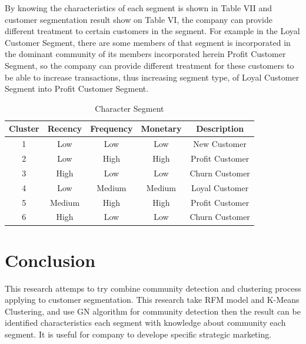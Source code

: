 \documentclass[conference]{IEEEtran}
\begin{document}
By knowing the characteristics of each segment is shown in Table VII and customer segmentation result show on Table VI, the company can provide different treatment to certain customers in the segment. For example in the Loyal Customer Segment, there are some members of that segment is incorporated in the dominant community of its members incorporated herein Profit Customer Segment, so the company can provide different treatment for these customers to be able to increase transactions, thus increasing segment type, of Loyal Customer Segment into Profit Customer Segment.

\begin{table}[h]
\renewcommand{\arraystretch}{1.3}
\caption{Character Segment}
\label{tab:Character_segment}
\centering
\begin{tabular}{c|c|c|c|c}
    \hline
    Cluster & Recency & Frequency & Monetary & Description\\
    \hline
    1 & Low & Low & Low & New Customer\\
    \hline
    2 & Low & High & High & Profit Customer\\
    \hline
    3 & High & Low & Low & Churn Customer\\
    \hline
    4 & Low & Medium & Medium & Loyal Customer\\
    \hline
    5 & Medium & High & High & Profit Customer\\
    \hline
    6 & High & Low & Low & Churn Customer\\
    \hline
\end{tabular}
\end{table}

\section{Conclusion}
This research attemps to try combine community detection and clustering process applying to customer segmentation. This research take RFM model and K-Means Clustering, and use GN algorithm for community detection then the result can be identified characteristics each segment with knowledge about community each segment. It is useful for company to develope specific strategic marketing.




\end{document}

